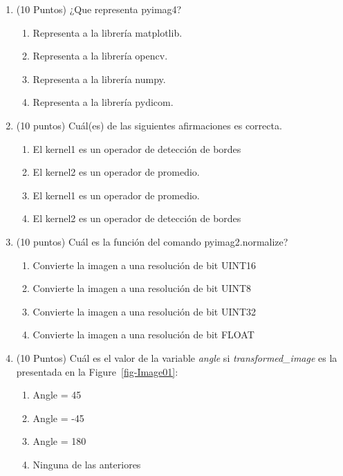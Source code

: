 \documentclass[12pt,a4paper]{article}
\providecommand{\tightlist}{%
  \setlength{\itemsep}{0pt}\setlength{\parskip}{0pt}}\usepackage{longtable,booktabs,array}
\providecommand{\tightlist}{%
  \setlength{\itemsep}{0pt}\setlength{\parskip}{2pt}}
\begin{document}
\begin{enumerate}
\tightlist
\item
  (10 Puntos) ¿Que representa pyimag4?

  \begin{enumerate}
  \tightlist
  \item
    Representa a la librería matplotlib.
  \item
    Representa a la librería opencv.
  \item
    Representa a la librería numpy.
  \item
    Representa a la librería pydicom.
  \end{enumerate}
\item
  (10 puntos) Cuál(es) de las siguientes afirmaciones es correcta.

  \begin{enumerate}
  \tightlist
  \item
    El kernel1 es un operador de detección de bordes\\
  \item
    El kernel2 es un operador de promedio.
  \item
    El kernel1 es un operador de promedio.
  \item
    El kernel2 es un operador de detección de bordes
  \end{enumerate}
\item
  (10 puntos) Cuál es la función del comando pyimag2.normalize?

  \begin{enumerate}
  \tightlist
  \item
    Convierte la imagen a una resolución de bit UINT16
  \item
    Convierte la imagen a una resolución de bit UINT8
  \item
    Convierte la imagen a una resolución de bit UINT32
  \item
    Convierte la imagen a una resolución de bit FLOAT
  \end{enumerate}
\item
  (10 Puntos) Cuál es el valor de la variable \emph{angle} si
  \emph{transformed\_image} es la presentada en la
  Figure~\ref{fig-Image01}:

  \begin{enumerate}
  \tightlist
  \item
    Angle = 45
  \item
    Angle = -45
  \item
    Angle = 180
  \item
    Ninguna de las anteriores
  \end{enumerate}
\end{enumerate}
\end{document}
